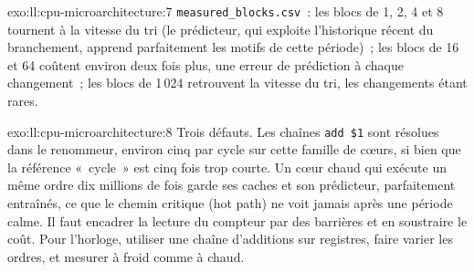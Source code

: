 \begin{solution}{exo:ll:cpu-microarchitecture:7}
\texttt{measured\_blocks.csv}~: les blocs de 1, 2, 4 et 8 tournent à la vitesse du tri (le prédicteur, qui exploite l'historique
récent du branchement, apprend parfaitement les motifs de cette période)~; les blocs de 16 et 64 coûtent environ deux fois plus, une
erreur de prédiction à chaque changement~; les blocs de 1\,024 retrouvent la vitesse du tri, les changements étant rares.
\end{solution}

\begin{solution}{exo:ll:cpu-microarchitecture:8}
Trois défauts. Les chaînes \texttt{add \$1} sont résolues dans le renommeur, environ cinq par cycle sur cette famille de cœurs, si bien que la
référence «~cycle~» est cinq fois trop courte. Un cœur chaud qui exécute un même ordre dix millions de fois garde ses caches et
son prédicteur, parfaitement entraînés, ce que le chemin critique (hot path) ne voit jamais après une période calme. Il faut encadrer la lecture du compteur par des barrières et
en soustraire le coût. Pour l'horloge, utiliser une chaîne d'additions sur registres, faire varier les ordres, et mesurer à froid comme à chaud.
\end{solution}

